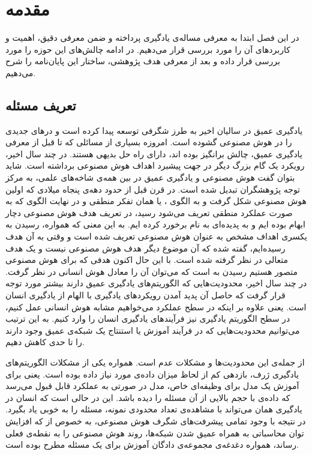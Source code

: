 \chapter{مقدمه}\label{Chap:Chap1}
\minitoc
\setcounter{footnote}{0}
\pagestyle{plain}
در این فصل ابتدا به معرفی مساله‌ی یادگیری
 پرداخته و ضمن معرفی دقیق، اهمیت و کاربردهای آن را مورد بررسی قرار می‌دهیم. در ادامه چالش‌های این حوزه را مورد بررسی قرار داده و بعد از معرفی هدف پژوهشی، ساختار این پایان‌نامه را شرح می‌دهیم.

\section{تعریف مسئله}
\label{sec:chap1:definition}
یادگیری عمیق در سالیان اخیر به طرز شگرفی توسعه پیدا کرده است و درهای جدیدی را در هوش مصنوعی گشوده است. امروزه بسیاری از مسائلی که تا قبل از معرفی یادگیری عمیق، چالش برانگیز بوده اند، دارای راه حل بدیهی هستند. در چند سال اخیر، رویکرد 
یک گام بزرگ دیگر در جهت پیشبرد اهداف هوش مصنوعی برداشته است. شاید بتوان گفت هوش مصنوعی و یادگیری عمیق در بین همه‌ی شاخه‌های علمی، به مرکز توجه پژوهشگران تبدیل شده است. در قرن قبل از حدود دهه‌ی پنجاه میلادی که اولین
هوش مصنوعی شکل گرفت و به الگوی 
، 
یا همان تفکر منطقی و در نهایت الگوی 
که به صورت عملکرد منطقی تعریف می‌شود رسید، در تعریف هدف هوش مصنوعی دچار ابهام بوده ایم و به پدیده‌ای به نام 
برخورد کرده ایم. به این معنی که همواره، رسیدن به یکسری اهداف مشخص به عنوان هوش مصنوعی تعریف شده است و وقتی به آن هدف رسیده‌ایم، گفته شده که آن موضوع دیگر هدف هوش مصنوعی نیست و یک هدف متعالی در نظر گرفته شده است. با این حال اکنون هدفی که برای هوش مصنوعی متصور هستیم رسیدن به 
است که می‌توان آن را معادل هوش انسانی در نظر گرفت. در چند سال اخیر، محدودیت‌هایی که الگوریتم‌‌های یادگیری عمیق دارند بیشتر مورد توجه قرار گرفت که حاصل آن پدید آمدن رویکرد‌های یادگیری با الهام از یادگیری انسان است. یعنی علاوه بر اینکه در سطح عملکرد می‌خواهیم مشابه هوش انسانی عمل کنیم، در سطح الگوریتم یادگیری نیز فرآیند‌های یادگیری انسان را وارد کنیم. به این ترتیب می‌توانیم محدودیت‌هایی که در فرآیند آموزش یا استنتاج یک شبکه‌ی عمیق وجود دارند را تا حدی کاهش دهیم.

 از جمله‌ی این محدودیت‌ها 
 و مشکلات عدم
 است. همواره یکی از مشکلات الگوریتم‌های یادگیری ژرف، بازدهی کم از لحاظ میزان داده‌ی مورد نیاز داده بوده است. یعنی برای آموزش یک مدل برای وظیفه‌ای خاص، مدل در صورتی به عملکرد قابل قبول می‌رسد که داده‌ی با حجم بالایی از آن مسئله را دیده باشد. این در حالی است که انسان در یادگیری همان 
 می‌تواند با مشاهده‌ی تعداد محدودی نمونه، مسئله را به خوبی یاد بگیرد. در نتیجه با وجود تمامی پیشرفت‌های شگرف هوش مصنوعی، به خصوص از
  که افزایش توان محاسباتی به همراه عمیق شدن شبکه‌ها، روند هوش مصنوعی را به نقطه‌ی فعلی رساند، همواره دغدغه‌ی مجموعه‌ی دادگان آموزش برای یک مسئله مطرح بوده است.
  
